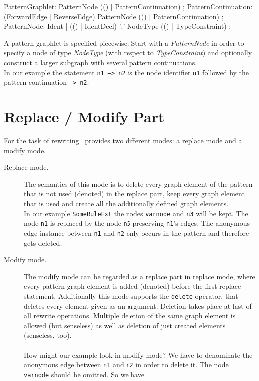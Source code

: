 \begin{rail}   
  PatternGraphlet: PatternNode (() | PatternContinuation) ;
  PatternContinuation: (ForwardEdge | ReverseEdge) PatternNode (() | PatternContinuation) ;
  PatternNode: Ident | 
    (() | IdentDecl) ':' NodeType (() | TypeConstraint) ; 
\end{rail}
A pattern graphlet is specified piecewise. Start with a \emph{PatternNode} in order to specify a node of type \emph{NodeType} (with respect to \emph{TypeConstraint}) and optionally construct a larger subgraph with several pattern continuations. \\
In our example the statement \texttt{n1 --> n2} is the node identifier \texttt{n1} followed by the pattern continuation \texttt{--> n2}.

\section{Replace / Modify Part}
\label{replacepart}
For the task of rewriting \GrG\ provides two different modes: a replace mode and a modify mode.
\begin{description}
  \item[Replace mode.] The semantics of this mode is to delete every graph element of the pattern that is not used (denoted) in the replace part, keep every graph element that is used and create all the additionally defined graph elements.\\
  In our example \texttt{SomeRuleExt} the nodes \texttt{varnode} and \texttt{n3} will be kept. The node \texttt{n1} is replaced by the node \texttt{n5} preserving \texttt{n1}'s edges. The anonymous edge instance between \texttt{n1} and \texttt{n2} only occurs in the pattern and therefore gets deleted.
  \item[Modify mode.] The modify mode can be regarded as a replace part in replace mode, where every pattern graph element is added (denoted) before the first replace statement. Additionally this mode supports the \texttt{delete} operator, that deletes every element given as an argument. Deletion takes place at last of all rewrite operations. Multiple deletion of the same graph element is allowed (but senseless) as well as deletion of just created elements (senseless, too).\\
 {\small \\ How might our example look in modify mode? We have to denominate the anonymous edge between \texttt{n1} and \texttt{n2} in order to delete it. The node \texttt{varnode} should be omitted. So we have}
\begin{grgen}
rule SomeRuleExtMod(varnode: Node): (Node, EdgeTypeB) {
  pattern {
    ...
    n1 -e0:Edge-> n2;
    ...
  }
  modify {
    n5 : NodeTypeC<n1>;
    n3 -e1:EdgeTypeB-> n5;
    delete(e0);
    eval {
      ...
\end{grgen}
\mbox{ }\\
\end{description}

